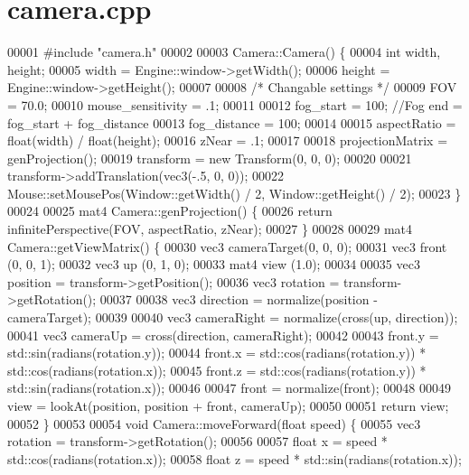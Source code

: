\section{camera.\+cpp}
\label{camera_8cpp_source}

\begin{DoxyCode}
00001 \textcolor{preprocessor}{#include "camera.h"}
00002 
00003 Camera::Camera() \{
00004     \textcolor{keywordtype}{int} width, height;
00005     width  = Engine::window->getWidth();
00006     height = Engine::window->getHeight();
00007 
00008     \textcolor{comment}{/* Changable settings */}
00009     FOV               = 70.0; 
00010     mouse\_sensitivity = .1;
00011     
00012     fog\_start = 100;   \textcolor{comment}{//Fog end = fog\_start + fog\_distance}
00013     fog\_distance = 100;
00014 
00015     aspectRatio = float(width) / float(height);
00016     zNear = .1;
00017 
00018     projectionMatrix = genProjection();
00019     transform        = \textcolor{keyword}{new} Transform(0, 0, 0);
00020 
00021     transform->addTranslation(vec3(-.5, 0, 0));
00022     Mouse::setMousePos(Window::getWidth() / 2, Window::getHeight() / 2);
00023 \}
00024 
00025 mat4 Camera::genProjection() \{
00026     \textcolor{keywordflow}{return} infinitePerspective(FOV, aspectRatio, zNear);
00027 \}
00028 
00029 mat4 Camera::getViewMatrix() \{
00030     vec3 cameraTarget(0, 0, 0);
00031     vec3 front       (0, 0, 1);
00032     vec3 up          (0, 1, 0);
00033     mat4 view        (1.0);
00034 
00035     vec3 position = transform->getPosition();
00036     vec3 rotation = transform->getRotation();
00037 
00038     vec3 direction = normalize(position - cameraTarget);
00039 
00040     vec3 cameraRight = normalize(cross(up, direction));
00041     vec3 cameraUp = cross(direction, cameraRight);
00042 
00043     front.y = std::sin(radians(rotation.y));
00044     front.x = std::cos(radians(rotation.y)) * std::cos(radians(rotation.x));
00045     front.z = std::cos(radians(rotation.y)) * std::sin(radians(rotation.x));
00046 
00047     front = normalize(front);
00048 
00049     view = lookAt(position, position + front, cameraUp);
00050 
00051     \textcolor{keywordflow}{return} view;
00052 \}
00053 
00054 \textcolor{keywordtype}{void} Camera::moveForward(\textcolor{keywordtype}{float} speed) \{
00055     vec3 rotation = transform->getRotation();
00056 
00057     \textcolor{keywordtype}{float} x = speed * std::cos(radians(rotation.x));
00058     \textcolor{keywordtype}{float} z = speed * std::sin(radians(rotation.x));

\end{DoxyCode}
